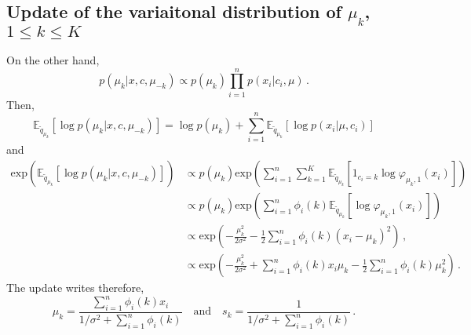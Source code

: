 \documentclass[english,graybox,envcountchap,envcountsame,sectrefs,shortlabels]{svmono}
\theoremstyle{style}
\begin{document}
\subsection*{Update of the variaitonal distribution of $\mu_k$, $1\leq k \leq K$}
On the other hand,
$$
p(\mu_k|x,c,\mu_{-k}) \propto p(\mu_k)\prod_{i=1}^np(x_i|c_i,\mu) \,. 
$$
Then,
$$
\mathbb{E}_{\tilde q_{\mu_k}}[\log p(\mu_k|x,c,\mu_{-k})] = \log p(\mu_k) + \sum_{i=1}^n \mathbb{E}_{\tilde q_{\mu_k}}[\log p(x_i|\mu,c_i)]
$$
and
\begin{align*}
\mathrm{exp}\left(\mathbb{E}_{\tilde q_{\mu_k}}[\log p(\mu_k|x,c,\mu_{-k})]\right) &\propto p(\mu_k) \mathrm{exp}\left(\sum_{i=1}^n\sum_{k=1}^K  \mathbb{E}_{\tilde q_{\mu_k}}[1_{c_i=k}\log \varphi_{\mu_k,1}(x_i)]\right)\,\\
&\propto p(\mu_k) \mathrm{exp}\left(\sum_{i=1}^n \phi_i(k) \mathbb{E}_{\tilde q_{\mu_k}}[\log \varphi_{\mu_k,1}(x_i)]\right)\,\\
&\propto \mathrm{exp}\left(-\frac{\mu_k^2}{2\sigma^2}-\frac{1}{2}\sum_{i=1}^n \phi_i(k)(x_i-\mu_k)^2\right)\,,\\
&\propto \mathrm{exp}\left(-\frac{\mu_k^2}{2\sigma^2}+\sum_{i=1}^n \phi_i(k)x_i\mu_k - \frac{1}{2}\sum_{i=1}^n \phi_i(k)\mu^2_k\right)\,.
\end{align*}
The update writes therefore,
$$
\mu_k = \frac{\sum_{i=1}^n \phi_i(k)x_i}{1/\sigma^2 + \sum_{i=1}^n \phi_i(k)}\quad\mathrm{and}\quad s_k = \frac{1}{1/\sigma^2 + \sum_{i=1}^n \phi_i(k)}\,. 
$$
\end{document}
